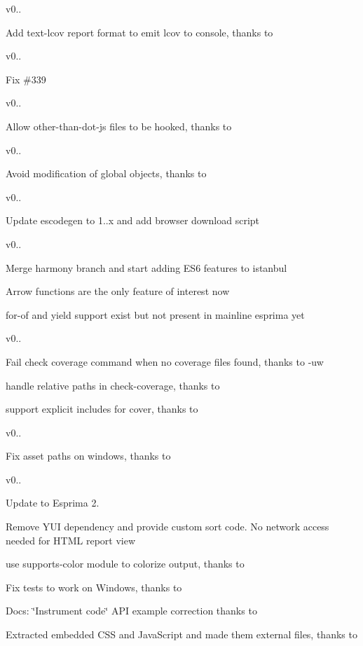 v0.. 

Add text-\/lcov report format to emit lcov to console, thanks to    

v0.. 

Fix \#339   

v0.. 

Allow other-\/than-\/dot-\/js files to be hooked, thanks to    

v0.. 

Avoid modification of global objects, thanks to    

v0.. 

Update escodegen to 1..\+x and add browser download script   

v0.. 


\begin{DoxyItemize}
\item Merge harmony branch and start adding E\+S6 features to istanbul 
\item Arrow functions are the only feature of interest now 
\item {\ttfamily for-\/of} and {\ttfamily yield} support exist but not present in mainline esprima yet 
\end{DoxyItemize}

v0.. 


\begin{DoxyItemize}
\item Fail check coverage command when no coverage files found, thanks to -\/uw 
\item handle relative paths in check-\/coverage, thanks to  
\item support explicit includes for cover, thanks to  
\end{DoxyItemize}

v0.. 

Fix asset paths on windows, thanks to    

v0.. 


\begin{DoxyItemize}
\item Update to Esprima 2. 
\item Remove Y\+U\+I dependency and provide custom sort code. No network access needed for H\+T\+M\+L report view 
\item use supports-\/color module to colorize output, thanks to  
\item Fix tests to work on Windows, thanks to  
\item Docs\+: \char`\"{}\+Instrument code\char`\"{} A\+P\+I example correction thanks to  
\item Extracted embedded C\+S\+S and Java\+Script and made them external files, thanks to  
\end{DoxyItemize}

